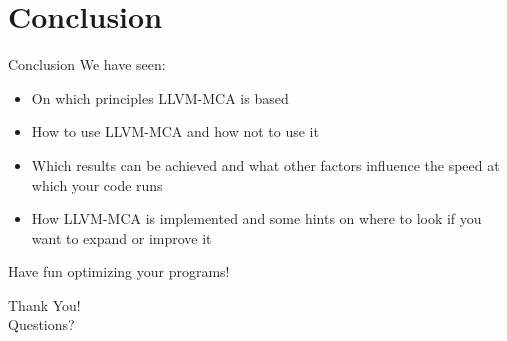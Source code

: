 
\section{Conclusion}


\begin{frame}{Conclusion}
We have seen:
\begin{itemize}
\item On which principles LLVM-MCA is based
\item How to use LLVM-MCA and how \alert{not} to use it
\item Which results can be achieved and what other factors 
	influence the speed at which your code runs
\item How LLVM-MCA is implemented and some hints on where to look
	if you want to expand or improve it
\end{itemize}
\bigskip
Have fun optimizing your programs!
\end{frame}


\begin{frame}[plain]{}
\Huge\centering
Thank You!\\
\bigskip
\normalsize
Questions?
\end{frame}

